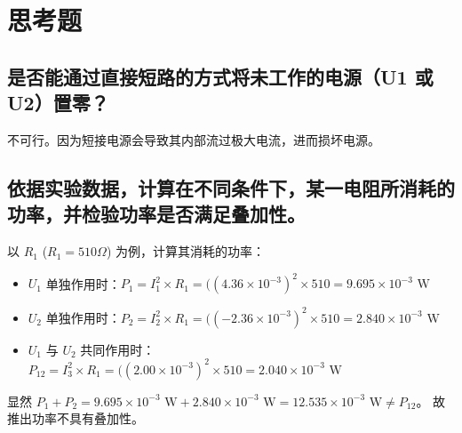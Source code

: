 \documentclass{Report} %
\begin{document}
\section{思考题}

\subsection{是否能通过直接短路的方式将未工作的电源（U1 或 U2）置零？}

不可行。因为短接电源会导致其内部流过极大电流，进而损坏电源。

\subsection{依据实验数据，计算在不同条件下，某一电阻所消耗的功率，并检验功率是否满足叠加性。}

以 $R_1$ ($R_1 = 510 \Omega$) 为例，计算其消耗的功率：
\begin{itemize}
    \item $U_1$ 单独作用时：$P_1 = I_1^2 \times R_1 = ((4.36 \times 10^{-3})^2 \times 510 = 9.695 \times 10^{-3} \text{ W}$
    \item $U_2$ 单独作用时：$P_2 = I_2^2 \times R_1 = ((-2.36 \times 10^{-3})^2 \times 510 = 2.840 \times 10^{-3} \text{ W}$
    \item $U_1$ 与 $U_2$ 共同作用时：$P_{12} = I_3^2 \times R_1 = ((2.00 \times 10^{-3})^2 \times 510 = 2.040 \times 10^{-3} \text{ W}$
\end{itemize}

显然 $P_1 + P_2 = 9.695 \times 10^{-3} \text{ W} + 2.840 \times 10^{-3} \text{ W} = 12.535 \times 10^{-3} \text{ W} \neq P_{12}$。
故推出功率不具有叠加性。
\end{document}
